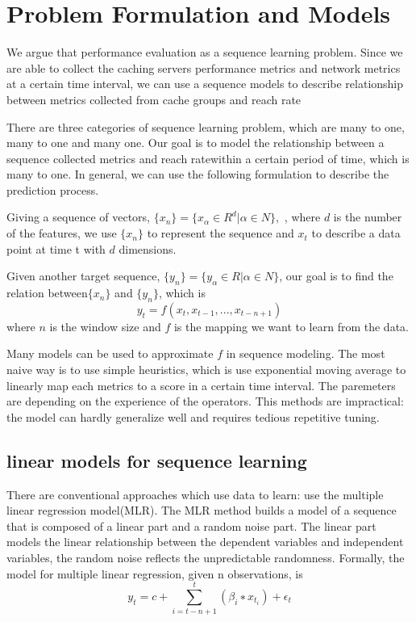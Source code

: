 \documentclass[5p]{elsarticle}
\newcommand{\dabiaolv}{reach rate}
\begin{document}
\section{Problem Formulation and Models}
We argue that performance evaluation as a sequence learning problem. Since we are able to collect the caching servers performance metrics and network metrics at a certain time interval, we can use a sequence models to describe relationship between metrics collected from  cache groups and \dabiaolv

There are three categories of sequence learning problem, which are many to one, many to one and many one. Our goal is to model the relationship between a sequence collected metrics and \dabiaolv within a certain period of time, which is many to one. In general, we can use the following formulation to describe the prediction process.

Giving a sequence of vectors, $\{x_n\}=\{x_{\alpha} \in R^{d}|\alpha \in N\}, $ , where $d$ is the number of the features, we use $\{x_n\}$ to represent the sequence and $x_t$ to describe a data point at time t with $d$ dimensions.

Given another target sequence, $\{y_n\}=\{y_{\alpha} \in R|\alpha \in N\}$, our goal is to find the relation between$\{x_n\}$ and $\{y_n\}$, which is 
$$y_t=f(x_{t},x_{t-1},...,x_{t-n+1})$$
where $n$ is the window size and $f$ is the mapping we want to learn from the data.

Many models can be used to approximate $f$ in sequence modeling. The most naive way is to use simple heuristics, which is use exponential moving average to linearly map each metrics to a score in a certain time interval. The paremeters are depending on the experience of the operators. This methods are impractical: the model can hardly generalize well and requires tedious repetitive tuning.

\subsection{linear models for sequence learning}

There are conventional approaches which use data to learn: use the multiple linear regression model(MLR). The MLR method builds a model of a sequence that is composed of a linear part and a random noise part. The linear part models the linear relationship between the dependent variables and independent variables, the random noise reflects the unpredictable randomness. Formally, the model for multiple linear regression, given n observations, is 
    $$y_t = c+\sum_{i=t-n+1}^{t}(\beta_i ∗ x_{t_i})+\epsilon_t$$
\end{document}
